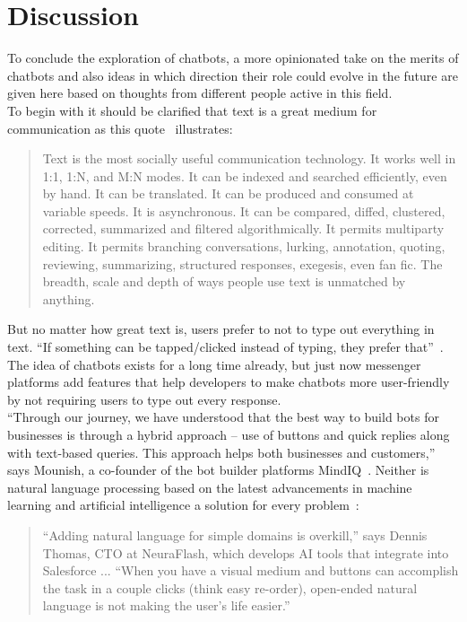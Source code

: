 \chapter{Discussion}

To conclude the exploration of chatbots, a more opinionated take on the merits of chatbots
and also ideas in which direction their role could evolve in the future are given here
based on thoughts from different people active in this field.
\\

To begin with it should be clarified that text is a great medium for communication as this quote~\cite{futuretext} illustrates:

\begin{quote}
Text is the most socially useful communication technology. It works well in 1:1, 1:N, and M:N modes. It can be indexed and searched efficiently, even by hand. It can be translated. It can be produced and consumed at variable speeds. It is asynchronous. It can be compared, diffed, clustered, corrected, summarized and filtered algorithmically. It permits multiparty editing. It permits branching conversations, lurking, annotation, quoting, reviewing, summarizing, structured responses, exegesis, even fan fic. The breadth, scale and depth of ways people use text is unmatched by anything.
\end{quote}

But no matter how great text is, users prefer to not to type out everything in text.
``If something can be tapped/clicked instead of typing, they prefer that''~\cite{chatbotslife}.
\\
The idea of chatbots exists for a long time already,
but just now messenger platforms add features that help developers to make chatbots more user-friendly by not requiring users to type out every response.
\\
``Through our journey, we have understood that the best way to build bots for businesses is through a hybrid approach – use of buttons and quick replies along with text-based queries. This approach helps both businesses and customers,'' says Mounish, a co-founder of the bot builder platforms MindIQ~\cite{techinasia}.
Neither is natural language processing based on the latest advancements in machine learning and artificial intelligence a solution for every problem~\cite{neednlp}:

\begin{quote}
“Adding natural language for simple domains is overkill,” says Dennis Thomas, CTO at NeuraFlash, which develops AI tools that integrate into Salesforce ... “When you have a visual medium and buttons can accomplish the task in a couple clicks (think easy re-order), open-ended natural language is not making the user’s life easier.”
\end{quote}

